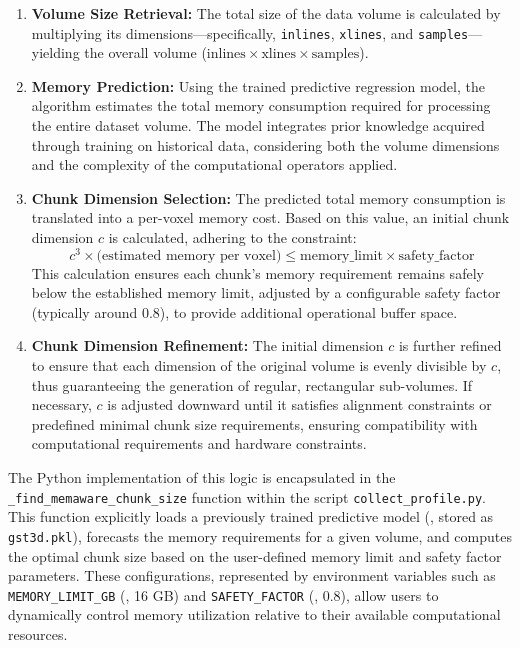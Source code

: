 \begin{enumerate}
    \item \textbf{Volume Size Retrieval:} The total size of the data volume is calculated by multiplying its dimensions—specifically, \texttt{inlines}, \texttt{xlines}, and \texttt{samples}—yielding the overall volume ($\text{inlines}\times \text{xlines}\times \text{samples}$).

    \item \textbf{Memory Prediction:} Using the trained predictive regression model, the algorithm estimates the total memory consumption required for processing the entire dataset volume. The model integrates prior knowledge acquired through training on historical data, considering both the volume dimensions and the complexity of the computational operators applied.

    \item \textbf{Chunk Dimension Selection:} The predicted total memory consumption is translated into a per-voxel memory cost. Based on this value, an initial chunk dimension $c$ is calculated, adhering to the constraint:
    \begin{equation}
        \label{eq:chunk_dimension_selection}
        c^3 \times \text{(estimated memory per voxel)} \leq \text{memory\_limit} \times \text{safety\_factor}
    \end{equation}
    This calculation ensures each chunk’s memory requirement remains safely below the established memory limit, adjusted by a configurable safety factor (typically around 0.8), to provide additional operational buffer space.

    \item \textbf{Chunk Dimension Refinement:} The initial dimension $c$ is further refined to ensure that each dimension of the original volume is evenly divisible by $c$, thus guaranteeing the generation of regular, rectangular sub-volumes. If necessary, $c$ is adjusted downward until it satisfies alignment constraints or predefined minimal chunk size requirements, ensuring compatibility with computational requirements and hardware constraints.

\end{enumerate}

The Python implementation of this logic is encapsulated in the \texttt{\_find\_memaware\_chunk\_size} function within the script \texttt{collect\_profile.py}. 
This function explicitly loads a previously trained predictive model (\eg, stored as \texttt{gst3d.pkl}), forecasts the memory requirements for a given volume, and computes the optimal chunk size based on the user-defined memory limit and safety factor parameters. 
These configurations, represented by environment variables such as \texttt{MEMORY\_LIMIT\_GB} (\eg, 16 GB) and \texttt{SAFETY\_FACTOR} (\eg, 0.8), allow users to dynamically control memory utilization relative to their available computational resources.

